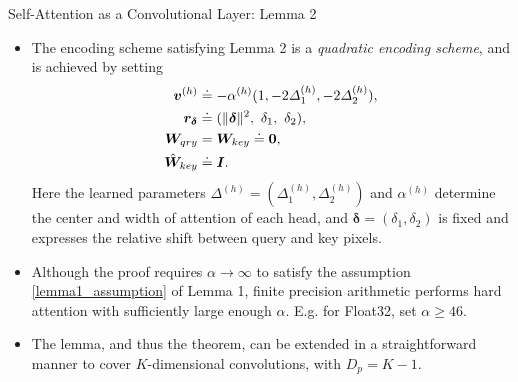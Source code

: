 \documentclass[9pt]{beamer}
\newcommand{\mb}{\bm}
\begin{document}
\begin{frame}{Self-Attention as a Convolutional Layer: Lemma 2}
\begin{itemize}
\item The encoding scheme satisfying Lemma 2 is a {\em quadratic encoding scheme}, and is achieved by setting
\begin{align}
    \mb v\brac h &\doteq -\alpha\brac h 
        (1, -2\varDelta_1\brac h, -2\varDelta_2\brac h), \nonumber \\
    \mb r_{\bm \delta} &\doteq (\Vert\bm\delta\Vert^2,\ \delta_1,\ \delta_2), \\
    \mb W_{qry} &= \mb W_{key} \doteq \bm 0, \nonumber \\
    \hat{\mb W}_{key} &\doteq \mb I. \nonumber
\end{align}
Here the learned parameters $\varDelta^{(h)} = (\varDelta_1^{(h)}, \varDelta_2^{(h)})$ and $\alpha^{(h)}$ determine the center and width of attention of each head, and $\bm\delta = (\delta_1, \delta_2)$ is fixed and expresses the relative shift between query and key pixels.

\item Although the proof requires $\alpha\rightarrow\infty$ to satisfy the assumption \eqref{lemma1_assumption} of Lemma 1, finite precision arithmetic performs hard attention with sufficiently large enough $\alpha$. E.g. for Float32, set $\alpha\geq46$. 

\item The lemma, and thus the theorem, can be extended in a straightforward manner to cover $K$-dimensional convolutions, with $D_p=K-1$.
\end{itemize}
\end{frame}
\end{document}
